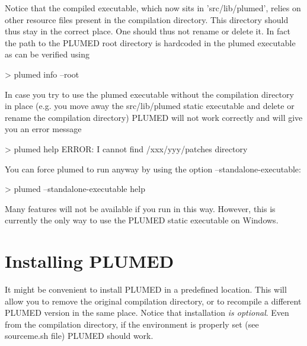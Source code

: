 Notice that the compiled executable, which now sits in 'src/lib/plumed', relies on other resource files present in the compilation directory. This directory should thus stay in the correct place. One should thus not rename or delete it. In fact the path to the P\+L\+U\+M\+E\+D root directory is hardcoded in the plumed executable as can be verified using \begin{DoxyVerb}> plumed info --root
\end{DoxyVerb}
 In case you try to use the plumed executable without the compilation directory in place (e.\+g. you move away the src/lib/plumed static executable and delete or rename the compilation directory) P\+L\+U\+M\+E\+D will not work correctly and will give you an error message \begin{DoxyVerb}> plumed help
ERROR: I cannot find /xxx/yyy/patches directory
\end{DoxyVerb}
 You can force plumed to run anyway by using the option --standalone-\/executable\+: \begin{DoxyVerb}> plumed --standalone-executable help
\end{DoxyVerb}
 Many features will not be available if you run in this way. However, this is currently the only way to use the P\+L\+U\+M\+E\+D static executable on Windows.\hypertarget{_installation_InstallingPlumed}{}\section{Installing P\+L\+U\+M\+E\+D}\label{_installation_InstallingPlumed}
It might be convenient to install P\+L\+U\+M\+E\+D in a predefined location. This will allow you to remove the original compilation directory, or to recompile a different P\+L\+U\+M\+E\+D version in the same place. Notice that installation {\itshape is optional}. Even from the compilation directory, if the environment is properly set (see sourceme.\+sh file) P\+L\+U\+M\+E\+D should work.

